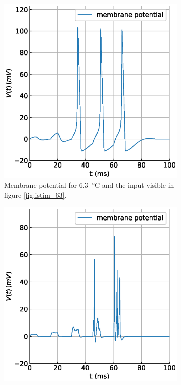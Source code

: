 \documentclass{scrartcl}			%
\begin{document}
\begin{figure}[H] 
  \begin{subfigure}[b]{0.5\linewidth}
    \centering
    \includegraphics[width=\linewidth]{imgs/membrane_pot_at_6.eps} 
    \caption{Membrane potential for \SI{6.3}{\celsius} and the input visible in figure \ref{fig:istim_63}.} 
    \label{fig:vmem_63} 
  \end{subfigure}%
  \quad
  \begin{subfigure}[b]{0.5\linewidth}
    \centering
    \includegraphics[width=\linewidth]{imgs/membrane_pot_at_28.eps} 

\end{subfigure}
\end{figure}
\end{document}
